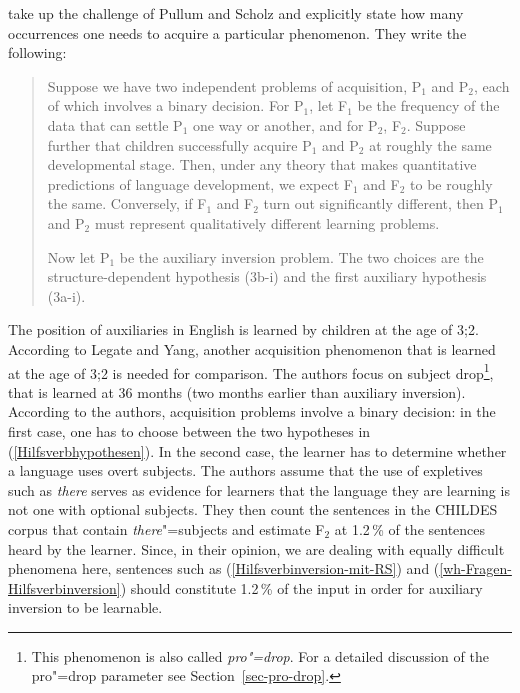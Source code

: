 \citet{LY2002a} take up the challenge of Pullum and Scholz and explicitly state how many occurrences one needs to acquire a particular phenomenon.
They write the following:

\begin{quote}
   Suppose we have two independent problems of acquisition, P$_1$ and P$_2$, each
of which involves a binary decision. For P$_1$, let F$_1$ be the frequency of the
data that can settle P$_1$ one way or another, and for P$_2$, F$_2$. Suppose further
that children successfully acquire P$_1$ and P$_2$ at roughly the same developmental
stage. Then, under any theory that makes quantitative predictions of language
development, we expect F$_1$ and F$_2$ to be roughly the same. Conversely, if F$_1$ and
F$_2$ turn out significantly different, then P$_1$ and P$_2$ must represent qualitatively
different learning problems.

   Now let P$_1$ be the auxiliary inversion problem. The two choices are the
structure-dependent hypothesis (3b-i) and the first auxiliary hypothesis (3a-i). \citep[]{LY2002a}
\end{quote}

\noindent
The position of auxiliaries in English is learned by children at the age of 3;2. According to Legate
and Yang, another acquisition phenomenon that is learned at the age of 3;2 is needed for
comparison. The authors focus on subject drop\footnote{%
  This phenomenon is also called \emph{pro"=drop}. For a detailed discussion of the pro"=drop
  parameter see Section~\ref{sec-pro-drop}.
}, that is learned
at 36 months (two months earlier than auxiliary inversion). According to the authors, acquisition problems involve a binary decision:
in the first case, one has to choose between the two hypotheses in (\ref{Hilfsverbhypothesen}). In the second case, the learner has to determine
whether a language uses overt subjects. The authors assume that the use of expletives such as \emph{there} serves as
evidence for learners that the language they are learning is not one with optional subjects. They then count the sentences in the CHILDES corpus
that contain \emph{there}"=subjects and estimate F$_2$ at 1.2\,\% of the sentences heard by the learner.
Since, in their opinion, we are dealing with equally difficult phenomena here, sentences such as (\ref{Hilfsverbinversion-mit-RS}) and (\ref{wh-Fragen-Hilfsverbinversion})
should constitute 1.2\,\% of the input in order for auxiliary inversion to be learnable.

